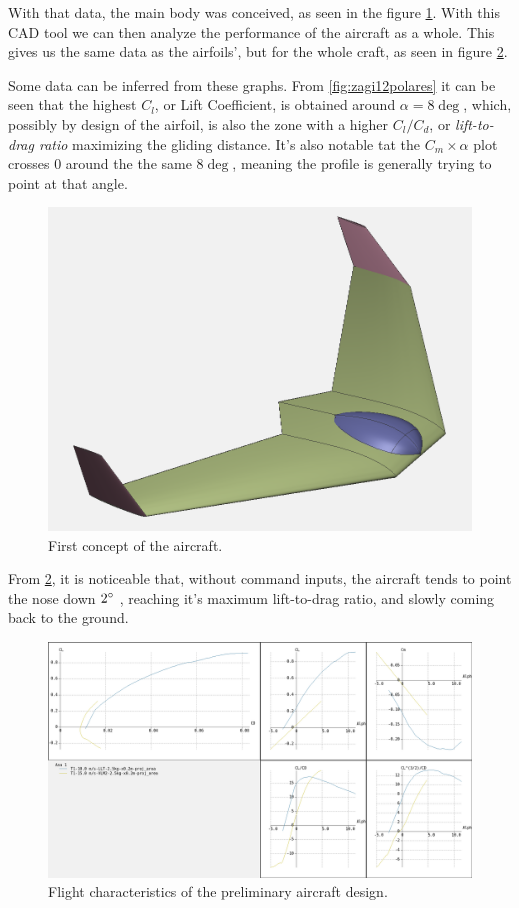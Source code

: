 With that data, the main body was conceived, as seen in the figure \ref{fig:preliminar}. With this CAD tool we can then analyze the performance of the aircraft as a whole. This gives us the same data as the airfoils', but for the whole craft, as seen in figure \ref{fig:craftpolar}.

Some data can be inferred from these graphs. From \ref{fig:zagi12polares} it can be seen that the highest $C_l$, or Lift Coefficient, is obtained around $\alpha = 8\deg$, which, possibly by design of the airfoil, is also the zone with a higher $C_l/C_d$, or \textit{lift-to-drag ratio} maximizing the gliding distance. It's also notable tat the $C_m  \times \alpha$ plot crosses 0 around the the same $8\deg$, meaning the profile is generally trying to point at that angle.

\begin{figure}
\centering
  \includegraphics[width=\linewidth]{figs/preliminar.png}
  \caption{First concept of the aircraft.}
  \label{fig:preliminar}
\end{figure}


From \ref{fig:craftpolar}, it is noticeable that, without command inputs, the aircraft tends to point the nose down $ 2 \degree $ , reaching it's maximum lift-to-drag ratio, and slowly coming back to the ground.

\begin{figure}
\centering
  \includegraphics[width=\linewidth]{figs/craftpolar.png}
  \caption{Flight characteristics of the preliminary aircraft design.}
  \label{fig:craftpolar}
\end{figure}


